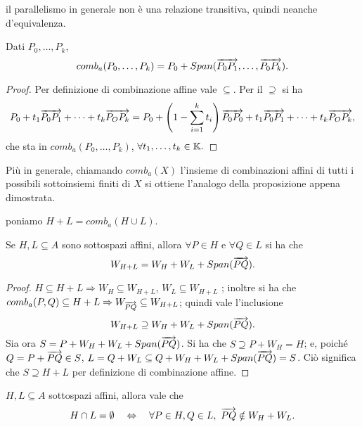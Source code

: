  \begin{remark}
 il parallelismo in generale non è una relazione transitiva, quindi neanche d'equivalenza.
 \end{remark}

 \begin{proposition}
 Dati $P_0,\dots,P_k$,
 \[
	comb_a(P_0,\dots,P_k)= P_0+Span(\overrightarrow{P_0P_1},\dots,\overrightarrow{P_0P_k}).
 \]
 \end{proposition}
 
 \begin{proof}
 Per definizione di combinazione affine vale $\subseteq$. Per il $\supseteq$ si ha
 \[
	P_0+t_1\overrightarrow{P_0P_1}+\dots+t_k\overrightarrow{P_OP_k} 
		=P_0+\left(1-\sum_{i=1}^{k}t_i\right)\overrightarrow{P_0P_0}+t_1\overrightarrow{P_0P_1}+\dots+t_k\overrightarrow{P_OP_k},
 \]
 che sta in $comb_a(P_0,\dots,P_k)$, $\forall t_1,\dots,t_k\in \mathbb K.$
 \end{proof}
 
 Più in generale, chiamando $comb_a(X)$ l'insieme di combinazioni affini di tutti i possibili sottoinsiemi finiti di $X$
 si ottiene l'analogo della proposizione appena dimostrata.
 
 \begin{definition}
	poniamo $H+L = comb_a(H\cup L)$.
 \end{definition}
 
 \begin{proposition}[Giacitura di $H+L$] Se $H,L\subseteq A$ sono sottospazi affini, allora
 $\forall P\in H$ e $\forall Q \in L$ si ha che
 \[
	W_{H+L}=W_H+W_L+Span(\overrightarrow{PQ}).
 \]
 \end{proposition}

 \begin{proof}
  $H\subseteq H+L \Rightarrow W_H \subseteq W_{H+L}$, $W_L \subseteq W_{H+L}$ ; inoltre si ha che
 $comb_a(P,Q)\subseteq H+L \Rightarrow W_{\overrightarrow{PQ}}\subseteq W_{H+L}$; quindi vale l'inclusione
 \[
	W_{H+L}\supseteq W_H+W_L+Span(\overrightarrow{PQ}).
 \]
 Sia ora $S=P+W_H+W_L+Span(\overrightarrow{PQ})$. Si ha che $S\supseteq P+W_H = H$; e, poiché $Q= P+ \overrightarrow{PQ}\in S$,
 $L=Q+W_L \subseteq Q+W_H+W_L+Span(\overrightarrow{PQ})=S$. Ciò significa che $S\supseteq H+L$ per definizione di combinazione
 affine.
 \end{proof}
 
 \begin{lemma}
  $H,L\subseteq A$ sottospazi affini, allora vale che
 \[
	H\cap L = \emptyset\quad \Leftrightarrow\quad \forall P\in H, Q \in L,\ \vet{PQ}\notin W_H+W_L.
 \]
 \end{lemma}
 
